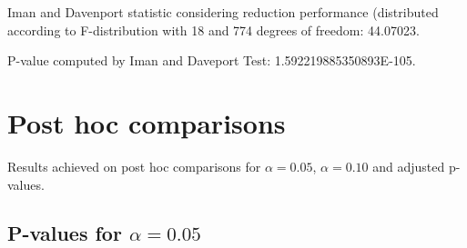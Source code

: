 \documentclass[a4paper,10pt]{article}
\begin{document}
\begin{landscape}
Iman and Davenport statistic considering reduction performance (distributed according to F-distribution with 18 and 774 degrees of freedom: 44.07023.

P-value computed by Iman and Daveport Test: 1.592219885350893E-105.\newline



\pagebreak

\section{Post hoc comparisons}

Results achieved on post hoc comparisons for $\alpha = 0.05$, $\alpha = 0.10$ and adjusted p-values.

\subsection{P-values for $\alpha=0.05$}


\end{landscape}
\end{document}

